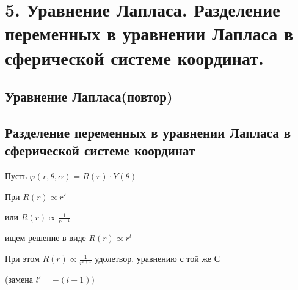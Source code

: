 \section*{5. Уравнение Лапласа. Разделение переменных в уравнении Лапласа в
сферической системе координат.}

\subsection*{Уравнение Лапласа(повтор)}

\subsection*{Разделение переменных в уравнении Лапласа в
сферической системе координат}

Пусть $\varphi(r,\theta,\alpha)=R(r)\cdot Y(\theta)$


При $R(r)\varpropto r'$

или $R(r)\varpropto \frac{1}{r^{l+1}}$


ищем решение в виде $R(r)\varpropto r^l$


При этом $R(r)\varpropto \frac{1}{r^{l+1}}$ удолетвор. уравнению с той же С 

(замена $l'=-(l+1)$) 